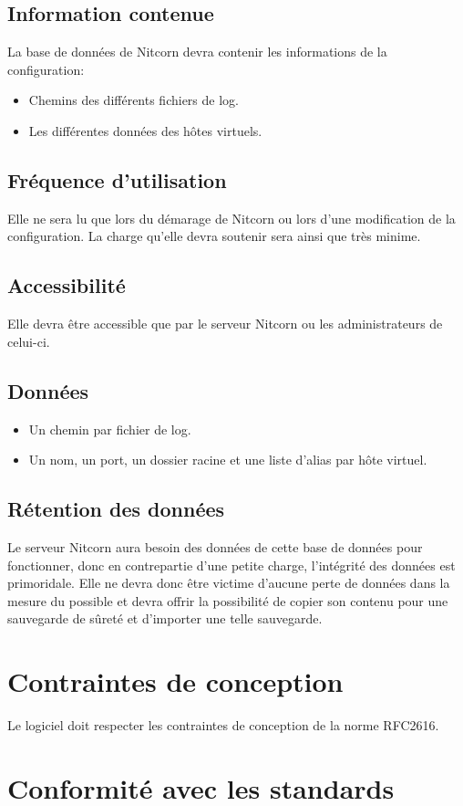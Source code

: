 \documentclass{scrreprt}
\begin{document}
\subsection{Information contenue}
La base de données de Nitcorn devra contenir les informations de la configuration:
\begin{itemize}
	\item Chemins des différents fichiers de log.
	\item Les différentes données des hôtes virtuels.
\end{itemize}
\subsection{Fréquence d'utilisation}
Elle ne sera lu que lors du démarage de Nitcorn ou lors d'une modification de la configuration.
La charge qu'elle devra soutenir sera ainsi que très minime.
\subsection{Accessibilité}
Elle devra être accessible que par le serveur Nitcorn ou les administrateurs de celui-ci.
\subsection{Données}
\begin{itemize}
	\item Un chemin par fichier de log.
	\item Un nom, un port, un dossier racine et une liste d'alias par hôte virtuel.
\end{itemize}
\subsection{Rétention des données}
Le serveur Nitcorn aura besoin des données de cette base de données pour fonctionner, donc en contrepartie d'une petite charge, l'intégrité des données est primoridale. Elle ne devra donc être victime d'aucune perte de données dans la mesure du possible et devra offrir la possibilité de copier son contenu pour une sauvegarde de sûreté et d'importer une telle sauvegarde.

\section{Contraintes de conception} Le logiciel doit respecter les contraintes de conception de la norme RFC2616.
\section{Conformité avec les standards}
\end{document}
